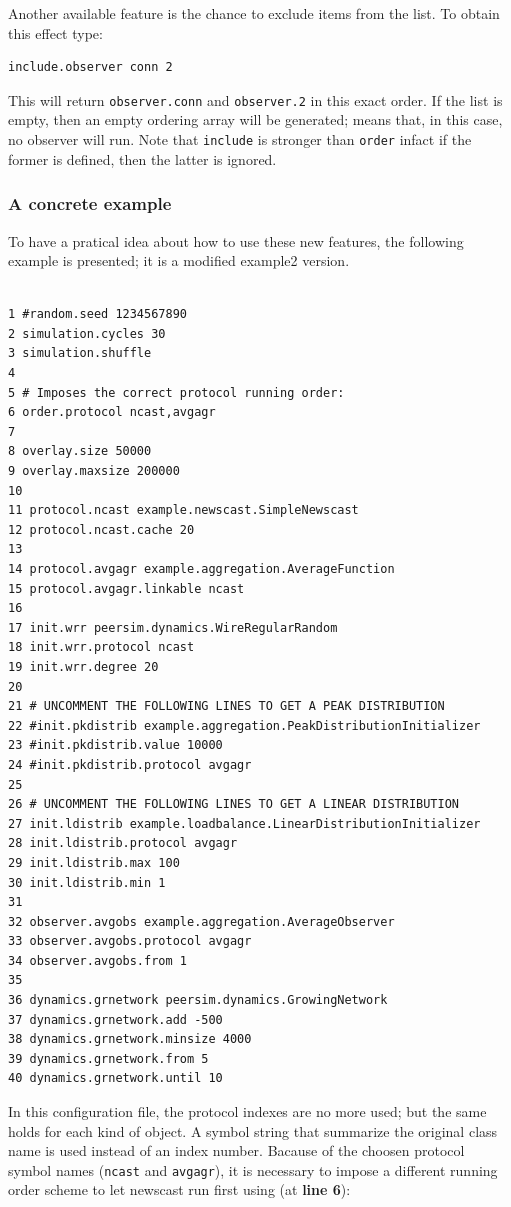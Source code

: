 \documentclass[a4paper,11pt]{article}
\begin{document}
Another available feature is the chance to exclude items from the
list. To obtain this effect type:

\begin{verbatim}
include.observer conn 2
\end{verbatim}

This will return \texttt{observer.conn} and \texttt{observer.2} in this 
exact order. If the list is empty, then an empty ordering array will be
generated; means that, in this case, no observer will run. Note that 
\texttt{include} is stronger than \texttt{order}
infact if the former is defined, then the latter is ignored.
 
\subsubsection{A concrete example}

To have a pratical idea about how to use these new features, the following
example is presented; it is a modified example2 version.

\footnotesize
\begin{verbatim}

1 #random.seed 1234567890
2 simulation.cycles 30
3 simulation.shuffle
4
5 # Imposes the correct protocol running order:
6 order.protocol ncast,avgagr
7
8 overlay.size 50000
9 overlay.maxsize 200000
10 
11 protocol.ncast example.newscast.SimpleNewscast
12 protocol.ncast.cache 20
13
14 protocol.avgagr example.aggregation.AverageFunction
15 protocol.avgagr.linkable ncast
16
17 init.wrr peersim.dynamics.WireRegularRandom
18 init.wrr.protocol ncast
19 init.wrr.degree 20
20
21 # UNCOMMENT THE FOLLOWING LINES TO GET A PEAK DISTRIBUTION
22 #init.pkdistrib example.aggregation.PeakDistributionInitializer
23 #init.pkdistrib.value 10000
24 #init.pkdistrib.protocol avgagr
25
26 # UNCOMMENT THE FOLLOWING LINES TO GET A LINEAR DISTRIBUTION
27 init.ldistrib example.loadbalance.LinearDistributionInitializer
28 init.ldistrib.protocol avgagr
29 init.ldistrib.max 100
30 init.ldistrib.min 1
31
32 observer.avgobs example.aggregation.AverageObserver
33 observer.avgobs.protocol avgagr
34 observer.avgobs.from 1
35
36 dynamics.grnetwork peersim.dynamics.GrowingNetwork
37 dynamics.grnetwork.add -500
38 dynamics.grnetwork.minsize 4000
39 dynamics.grnetwork.from 5
40 dynamics.grnetwork.until 10
\end{verbatim}
\normalsize

In this configuration file, the protocol indexes are no more used; 
but the same holds for each kind of object. A symbol string that
summarize the original class name is used instead of an index number.
Bacause of the choosen protocol symbol names (\texttt{ncast} and 
\texttt{avgagr}),
it is necessary to impose a different running order scheme to let
newscast run first using (at \textbf{line 6}):
\end{document}
